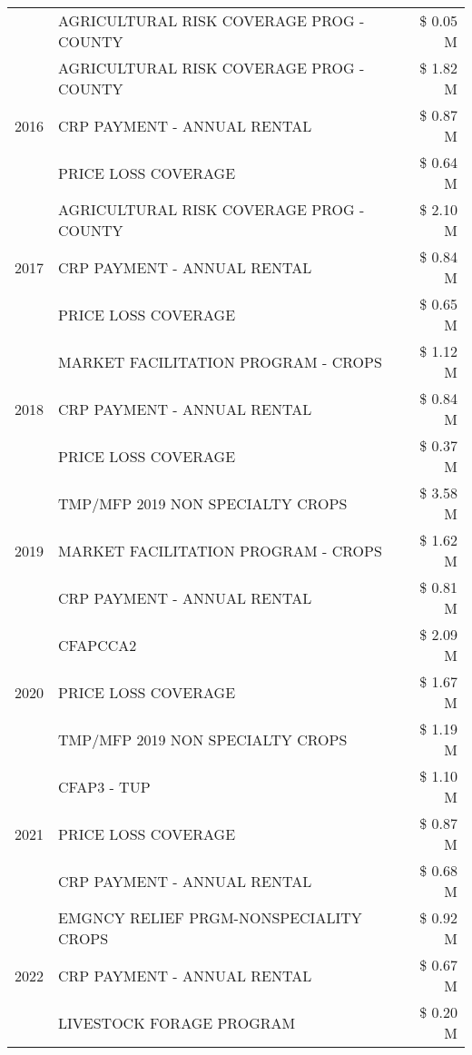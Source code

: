 \begin{tabular}{llr}
 & AGRICULTURAL RISK COVERAGE PROG - COUNTY & \$ 0.05 M \\
\cline{1-3}
\multirow[t]{3}{*}{2016} & AGRICULTURAL RISK COVERAGE PROG - COUNTY & \$ 1.82 M \\
 & CRP PAYMENT - ANNUAL RENTAL & \$ 0.87 M \\
 & PRICE LOSS COVERAGE & \$ 0.64 M \\
\cline{1-3}
\multirow[t]{3}{*}{2017} & AGRICULTURAL RISK COVERAGE PROG - COUNTY & \$ 2.10 M \\
 & CRP PAYMENT - ANNUAL RENTAL & \$ 0.84 M \\
 & PRICE LOSS COVERAGE & \$ 0.65 M \\
\cline{1-3}
\multirow[t]{3}{*}{2018} & MARKET FACILITATION PROGRAM - CROPS & \$ 1.12 M \\
 & CRP PAYMENT - ANNUAL RENTAL & \$ 0.84 M \\
 & PRICE LOSS COVERAGE & \$ 0.37 M \\
\cline{1-3}
\multirow[t]{3}{*}{2019} & TMP/MFP 2019 NON SPECIALTY CROPS & \$ 3.58 M \\
 & MARKET FACILITATION PROGRAM - CROPS & \$ 1.62 M \\
 & CRP PAYMENT - ANNUAL RENTAL & \$ 0.81 M \\
\cline{1-3}
\multirow[t]{3}{*}{2020} & CFAPCCA2 & \$ 2.09 M \\
 & PRICE LOSS COVERAGE & \$ 1.67 M \\
 & TMP/MFP 2019 NON SPECIALTY CROPS & \$ 1.19 M \\
\cline{1-3}
\multirow[t]{3}{*}{2021} & CFAP3 - TUP & \$ 1.10 M \\
 & PRICE LOSS COVERAGE & \$ 0.87 M \\
 & CRP PAYMENT - ANNUAL RENTAL & \$ 0.68 M \\
\cline{1-3}
\multirow[t]{3}{*}{2022} & EMGNCY RELIEF PRGM-NONSPECIALITY CROPS & \$ 0.92 M \\
 & CRP PAYMENT - ANNUAL RENTAL & \$ 0.67 M \\
 & LIVESTOCK FORAGE PROGRAM & \$ 0.20 M \\
\cline{1-3}
\bottomrule
\end{tabular}
